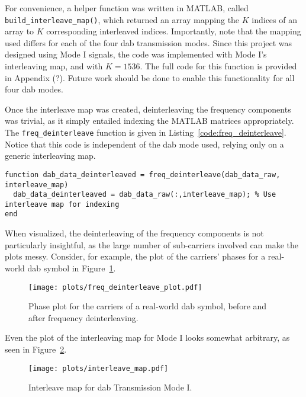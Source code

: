 \documentclass[class=report,11pt,crop=false]{standalone}
\begin{document}
For convenience, a helper function was written in MATLAB, called \texttt{build\_interleave\_map()}, which returned an array mapping the \(K\) indices of an array to \(K\) corresponding interleaved indices. Importantly, note that the mapping used differs for each of the four \gls{dab} transmission modes. Since this project was designed using Mode I signals, the code was implemented with Mode I's interleaving map, and with \(K = 1536\). The full code for this function is provided in Appendix (?). Future work should be done to enable this functionality for all four \gls{dab} modes.

Once the interleave map was created, deinterleaving the frequency components was trivial, as it simply entailed indexing the MATLAB matrices appropriately. The \texttt{freq\_deinterleave} function is given in Listing~\ref{code:freq_deinterleave}. Notice that this code is independent of the \gls{dab} mode used, relying only on a generic interleaving map.

\begin{lstlisting}[caption={MATLAB code for the frequency deinterleaving functionality.},label={code:freq_deinterleave}]
function dab_data_deinterleaved = freq_deinterleave(dab_data_raw, interleave_map)
  dab_data_deinterleaved = dab_data_raw(:,interleave_map); % Use interleave map for indexing
end
\end{lstlisting}

When visualized, the deinterleaving of the frequency components is not particularly insightful, as the large number of sub-carriers involved can make the plots messy. Consider, for example, the plot of the carriers' phases for a real-world \gls{dab} symbol in Figure~\ref{fig:freq_deinterleave_plot}.

\begin{figure}[htbp]
  \centering
  \captionsetup{type=figure}
  \texttt{[image: plots/freq\_deinterleave\_plot.pdf]}
  \caption{Phase plot for the carriers of a real-world \gls{dab} symbol, before and after frequency deinterleaving.}
  \label{fig:freq_deinterleave_plot}
\end{figure}

Even the plot of the interleaving map for Mode I looks somewhat arbitrary, as seen in Figure~\ref{fig:interleave_map}.

\begin{figure}[htbp]
  \centering
  \captionsetup{type=figure}
  \texttt{[image: plots/interleave\_map.pdf]}
  \caption{Interleave map for \gls{dab} Transmission Mode I.}
  \label{fig:interleave_map}
\end{figure}
\end{document}
